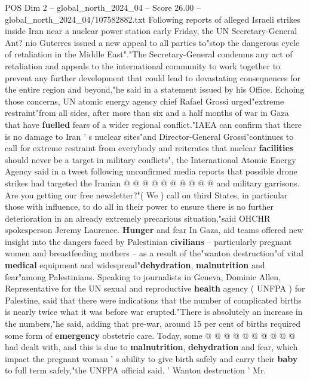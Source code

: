\begin{textsample}{POS Dim 2 – global\_north\_2024\_04 – Score 26.00 – global\_north\_2024\_04/107582882.txt}  \label{ex:f2_pos_270}
Following reports of alleged Israeli strikes inside Iran near a nuclear power station early Friday, the UN Secretary-General Ant? nio Guterres issued a new appeal to all parties to"stop the dangerous cycle of retaliation in the Middle East"."The Secretary-General condemns any act of retaliation and appeals to the international community to work together to prevent any further development that could lead to devastating consequences for the entire region and beyond,"he said in a statement issued by his Office.
Echoing those concerns, UN atomic energy agency chief Rafael Grossi urged"extreme restraint"from all sides, after more than six and a half months of war in Gaza that have \textbf{fuelled} fears of a wider regional conflict."IAEA can confirm that there is no damage to Iran ' s nuclear sites"and Director-General Grossi"continues to call for extreme restraint from everybody and reiterates that nuclear \textbf{facilities} should never be a target in military conflicts", the International Atomic Energy Agency said in a tweet following unconfirmed media reports that possible drone strikes had targeted the Iranian @ @ @ @ @ @ @ @ @ @ and military garrisons.
Are you getting our free newsletter?"( We ) call on third States, in particular those with influence, to do all in their power to ensure there is no further deterioration in an already extremely precarious situation,"said OHCHR spokesperson Jeremy Laurence. \textbf{Hunger} and fear In Gaza, aid teams offered new insight into the dangers faced by Palestinian \textbf{civilians} -- particularly pregnant women and breastfeeding mothers -- as a result of the"wanton destruction"of vital \textbf{medical} equipment and widespread"\textbf{dehydration}, \textbf{malnutrition} and fear"among Palestinians.
Speaking to journalists in Geneva, Dominic Allen, Representative for the UN sexual and reproductive \textbf{health} agency ( UNFPA ) for Palestine, said that there were indications that the number of complicated births is nearly twice what it was before war erupted."There is absolutely an increase in the numbers,"he said, adding that pre-war, around 15 per cent of births required some form of \textbf{emergency} obstetric care.
Today, some @ @ @ @ @ @ @ @ @ @ had dealt with, and this is due to \textbf{malnutrition}, \textbf{dehydration} and fear, which impact the pregnant woman ' s ability to give birth safely and carry their \textbf{baby} to full term safely,"the UNFPA official said. ' Wanton destruction ' Mr.

\end{textsample}
